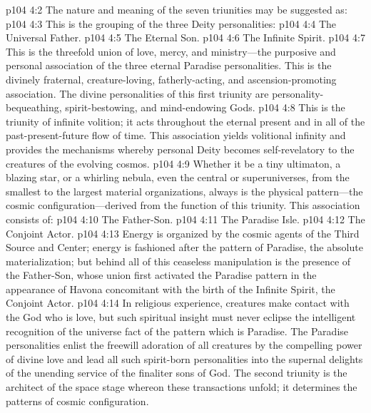 \pc \vs p104 4:2 The nature and meaning of the seven triunities may be suggested as:
\pc \vs p104 4:3  This is the grouping of the three Deity personalities:
\pc \vs p104 4:4 \bibnobreakspace The Universal Father.
\vs p104 4:5 \bibnobreakspace The Eternal Son.
\vs p104 4:6 \bibnobreakspace The Infinite Spirit.
\pc \vs p104 4:7 This is the threefold union of love, mercy, and ministry---the purposive and personal association of the three eternal Paradise personalities. This is the divinely fraternal, creature\hyp{}loving, fatherly\hyp{}acting, and ascension\hyp{}promoting association. The divine personalities of this first triunity are personality\hyp{}bequeathing, spirit\hyp{}bestowing, and mind\hyp{}endowing Gods.
\vs p104 4:8 This is the triunity of infinite volition; it acts throughout the eternal present and in all of the past\hyp{}present\hyp{}future flow of time. This association yields volitional infinity and provides the mechanisms whereby personal Deity becomes self\hyp{}revelatory to the creatures of the evolving cosmos.
\pc \vs p104 4:9  Whether it be a tiny ultimaton, a blazing star, or a whirling nebula, even the central or superuniverses, from the smallest to the largest material organizations, always is the physical pattern---the cosmic configuration---derived from the function of this triunity. This association consists of:
\pc \vs p104 4:10 \bibnobreakspace The Father\hyp{}Son.
\vs p104 4:11 \bibnobreakspace The Paradise Isle.
\vs p104 4:12 \bibnobreakspace The Conjoint Actor.
\pc \vs p104 4:13 Energy is organized by the cosmic agents of the Third Source and Center; energy is fashioned after the pattern of Paradise, the absolute materialization; but behind all of this ceaseless manipulation is the presence of the Father\hyp{}Son, whose union first activated the Paradise pattern in the appearance of Havona concomitant with the birth of the Infinite Spirit, the Conjoint Actor.
\vs p104 4:14 In religious experience, creatures make contact with the God who is love, but such spiritual insight must never eclipse the intelligent recognition of the universe fact of the pattern which is Paradise. The Paradise personalities enlist the freewill adoration of all creatures by the compelling power of divine love and lead all such spirit\hyp{}born personalities into the supernal delights of the unending service of the finaliter sons of God. The second triunity is the architect of the space stage whereon these transactions unfold; it determines the patterns of cosmic configuration.
